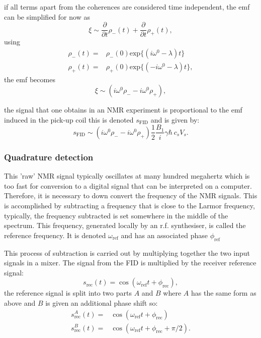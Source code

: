 if all terms apart from the coherences are considered time independent, the emf can be simplified for now as
\begin{equation}
  \xi \sim \frac{\partial}{\partial{t}}\rho_-(t) + \frac{\partial}{\partial{t}}\rho_+(t),
\end{equation}
using 
\begin{align}
  \rho_-(t) =& \rho_-(0)\text{exp}\{(i\omega^0-\lambda)t\}\\
  \rho_+(t) =& \rho_+(0)\text{exp}\{(-i\omega^0-\lambda)t\},
\end{align}
the emf becomes
\begin{equation}
  \xi \sim (i\omega^0\rho_- - i\omega^0\rho_+),
\end{equation}

the signal that one obtains in an NMR experiment is proportional to the emf induced in the pick-up coil this
is denoted $s_\text{FID}$ and is given by:
\begin{equation}
  s_\text{FID} \sim (i\omega^0\rho_- - i\omega^0\rho_+)\frac{1}{2}\frac{B_1}{i}\gamma\hbar~c_sV_s.
\end{equation}

\subsubsection{Quadrature detection}

This 'raw' NMR signal typically oscillates at many hundred megahertz which is too fast for
conversion to a digital signal that can be interpreted on a computer. Therefore,
it is necessary to down convert the frequency of the NMR signals. This is accomplished
by subtracting a frequency that is close to the Larmor frequency, typically, the frequency
subtracted is set somewhere in the middle of the spectrum. This frequency, generated locally
by an r.f. synthesiser, is called the reference frequency. It is denoted $\omega_\text{ref}$ and has an associated
phase $\phi_\text{ref}$

This process of subtraction is carried out by  multiplying together the two input signals in a mixer.
The signal from the FID is multiplied by the receiver reference signal:
\begin{equation}
  s_{\text{rec}}(t) = \cos(\omega_{\text{ref}}t + \phi_{\text{rec}}),
\end{equation}
the reference signal is split into two parts $A$ and $B$ where $A$ has the same form as above and $B$ is
given an additional phase shift so:
\begin{align}
  s_{\text{rec}}^A(t) =& \cos(\omega_{\text{ref}}t + \phi_{\text{rec}})\\
  s_{\text{rec}}^B(t) =& \cos(\omega_{\text{ref}}t + \phi_{\text{rec}} + \pi/2).
\end{align}

